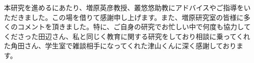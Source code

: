 本研究を進めるにあたり、増原英彦教授、叢悠悠助教にアドバイスやご指導をいただきました。この場を借りて感謝申し上げます。また、増原研究室の皆様に多くのコメントを頂きました。特に、ご自身の研究でお忙しい中で何度も協力してくださった田辺さん、私と同じく教育に関する研究をしており相談に乗ってくれた角田さん、学生室で雑談相手になってくれた津山くんに深く感謝しております。

